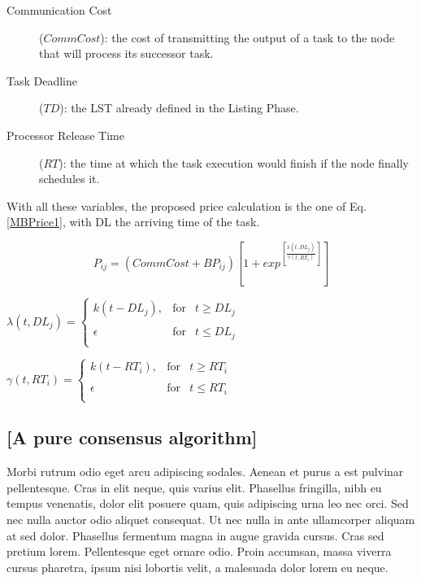\begin{enumerate}
\begin{description}
\item[Communication Cost] ($ CommCost $): the cost of transmitting the output of a task to the node that will process its successor task.

\item[Task Deadline] ($ TD $): the LST already defined in the Listing Phase.

\item[Processor Release Time] ($ RT $): the time at which the task execution would finish if the node finally schedules it.
\end{description}

With all these variables, the proposed price calculation is the one of Eq. \ref{MBPrice1}, with DL the arriving time of the task.

\begin{equation}
P_{ij} = (CommCost + BP_{ij})\left[1+exp^{\left[\frac{\lambda(t,DL_j)}{\gamma(t,RT_i)}\right]}\right]
\end{equation}

\begin{center}
$\lambda(t,DL_j) = \left\{ \begin{array}{lrc}
             k(t - DL_j), &   \mathrm{for } & t \geq DL_j \\
             \\ \epsilon &  \mathrm{for } & t \leq DL_j \\
             \end{array}
   \right.$
   
$\gamma(t,RT_i) = \left\{ \begin{array}{lrc}
             k(t - RT_i), &   \mathrm{for } & t \geq RT_i \\
             \\ \epsilon &  \mathrm{for } & t \leq RT_i \\
             \end{array}
   \right. $
\end{center}
\label{MBPrice1}

\end{enumerate}


\subsection{[A pure consensus algorithm]}
Morbi rutrum odio eget arcu adipiscing sodales. Aenean et purus a est pulvinar pellentesque. Cras in elit neque, quis varius elit. Phasellus fringilla, nibh eu tempus venenatis, dolor elit posuere quam, quis adipiscing urna leo nec orci. Sed nec nulla auctor odio aliquet consequat. Ut nec nulla in ante ullamcorper aliquam at sed dolor. Phasellus fermentum magna in augue gravida cursus. Cras sed pretium lorem. Pellentesque eget ornare odio. Proin accumsan, massa viverra cursus pharetra, ipsum nisi lobortis velit, a malesuada dolor lorem eu neque.